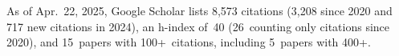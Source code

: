 %
As of Apr.~22, 2025, Google Scholar lists
8,573 citations (3,208 since 2020 and 717 new citations in 2024),
an h-index of~40 (26~counting only citations since 2020),
and 15~papers with 100+~citations, including 5~papers with 400+.
